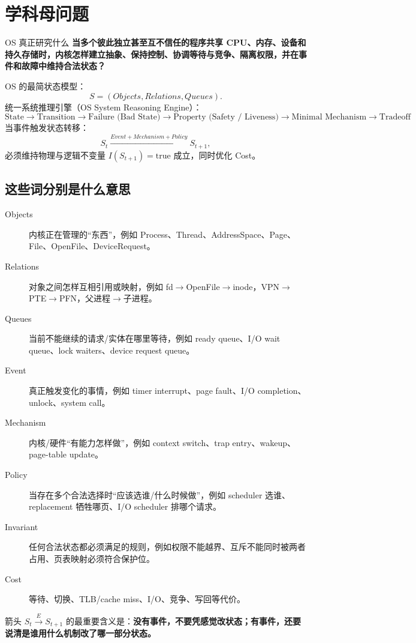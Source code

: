 \documentclass[11pt,a4paper,openany]{ctexbook}
\newcommand{\key}[1]{\textbf{\color{deep}#1}}
\begin{document}
\section{学科母问题}
\begin{corebox}{OS 真正研究什么}
\key{当多个彼此独立甚至互不信任的程序共享 CPU、内存、设备和持久存储时，内核怎样建立抽象、保持控制、协调等待与竞争、隔离权限，并在事件和故障中维持合法状态？}
\end{corebox}

OS 的最简状态模型：
\[
\boxed{S=(Objects,Relations,Queues)}.
\]
统一系统推理引擎（OS System Reasoning Engine）：
\[
\boxed{
\text{State} \to \text{Transition} \to \text{Failure (Bad State)} \to \text{Property (Safety / Liveness)} \to \text{Minimal Mechanism} \to \text{Tradeoff}
}
\]
当事件触发状态转移：
\[
S_t\xrightarrow{Event+Mechanism+Policy}S_{t+1},
\]
必须维持物理与逻辑不变量 $I(S_{t+1})=\mathrm{true}$ 成立，同时优化 Cost。

\subsection{这些词分别是什么意思}
\begin{description}
  \item[Objects] 内核正在管理的“东西”，例如 Process、Thread、AddressSpace、Page、File、OpenFile、DeviceRequest。
  \item[Relations] 对象之间怎样互相引用或映射，例如 fd$\to$OpenFile$\to$inode，VPN$\to$PTE$\to$PFN，父进程$\to$子进程。
  \item[Queues] 当前不能继续的请求/实体在哪里等待，例如 ready queue、I/O wait queue、lock waiters、device request queue。
  \item[Event] 真正触发变化的事情，例如 timer interrupt、page fault、I/O completion、unlock、system call。
  \item[Mechanism] 内核/硬件“有能力怎样做”，例如 context switch、trap entry、wakeup、page-table update。
  \item[Policy] 当存在多个合法选择时“应该选谁/什么时候做”，例如 scheduler 选谁、replacement 牺牲哪页、I/O scheduler 排哪个请求。
  \item[Invariant] 任何合法状态都必须满足的规则，例如权限不能越界、互斥不能同时被两者占用、页表映射必须符合保护位。
  \item[Cost] 等待、切换、TLB/cache miss、I/O、竞争、写回等代价。
\end{description}

箭头 $S_t\xrightarrow{E}S_{t+1}$ 的最重要含义是：\key{没有事件，不要凭感觉改状态；有事件，还要说清是谁用什么机制改了哪一部分状态。}
\end{document}
